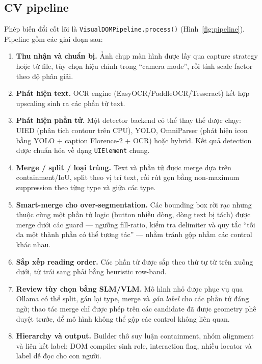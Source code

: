 \documentclass[11pt,a4paper]{article}
\newcommand{\code}[1]{\texttt{#1}}
\begin{document}
\subsection{CV pipeline}
Phép biến đổi cốt lõi là \code{VisualDOMPipeline.process()}
(Hình~\ref{fig:pipeline}). Pipeline gồm các giai đoạn sau:
\begin{enumerate}[leftmargin=1.6em]
  \item \textbf{Thu nhận và chuẩn bị.} Ảnh chụp màn hình được lấy qua capture
        strategy hoặc từ file, tùy chọn hiệu chỉnh trong ``camera mode'', rồi tính
        scale factor theo độ phân giải.
  \item \textbf{Phát hiện text.} OCR engine (EasyOCR/PaddleOCR/Tesseract) kết hợp
        upscaling sinh ra các phần tử text.
  \item \textbf{Phát hiện phần tử.} Một detector backend có thể thay thế được chạy:
        UIED (phân tích contour trên CPU), YOLO, OmniParser (phát hiện icon bằng
        YOLO + caption Florence-2 + OCR) hoặc hybrid. Kết quả detection được chuẩn
        hóa về dạng \code{UIElement} chung.
  \item \textbf{Merge / split / loại trùng.} Text và phần tử được merge dựa trên
        containment/IoU, split theo vị trí text, rồi rút gọn bằng non-maximum
        suppression theo từng type và giữa các type.
  \item \textbf{Smart-merge cho over-segmentation.} Các bounding box rời rạc nhưng
        thuộc cùng một phần tử logic (button nhiều dòng, dòng text bị tách) được
        merge dưới các guard --- ngưỡng fill-ratio, kiểm tra delimiter và quy tắc
        ``tối đa một thành phần có thể tương tác'' --- nhằm tránh gộp nhầm các
        control khác nhau.
  \item \textbf{Sắp xếp reading order.} Các phần tử được sắp theo thứ tự từ trên
        xuống dưới, từ trái sang phải bằng heuristic row-band.
  \item \textbf{Review tùy chọn bằng SLM/VLM.} Mô hình nhỏ được phục vụ qua Ollama
        có thể split, gán lại type, merge và \emph{gán label} cho các phần tử đáng
        ngờ; thao tác merge chỉ được phép trên các candidate đã được geometry phê
        duyệt trước, để mô hình không thể gộp các control không liên quan.
  \item \textbf{Hierarchy và output.} Builder thô suy luận containment, nhóm
        alignment và liên kết label; DOM compiler sinh role, interaction flag,
        nhiều locator và label dễ đọc cho con người.
\end{enumerate}
\end{document}
